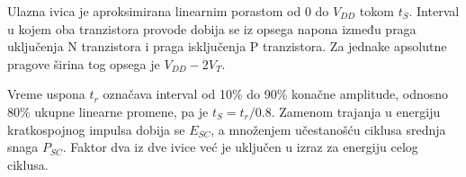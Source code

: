 Ulazna ivica je aproksimirana linearnim porastom od 0 do $V_{DD}$ tokom $t_S$. Interval u kojem oba tranzistora provode dobija se iz opsega napona između praga uključenja N tranzistora i praga isključenja P tranzistora. Za jednake apsolutne pragove širina tog opsega je $V_{DD}-2V_T$.

Vreme uspona $t_r$ označava interval od 10\% do 90\% konačne amplitude, odnosno 80\% ukupne linearne promene, pa je $t_S=t_r/0.8$. Zamenom trajanja u energiju kratkospojnog impulsa dobija se $E_{SC}$, a množenjem učestanošću ciklusa srednja snaga $P_{SC}$. Faktor dva iz dve ivice već je uključen u izraz za energiju celog ciklusa.
